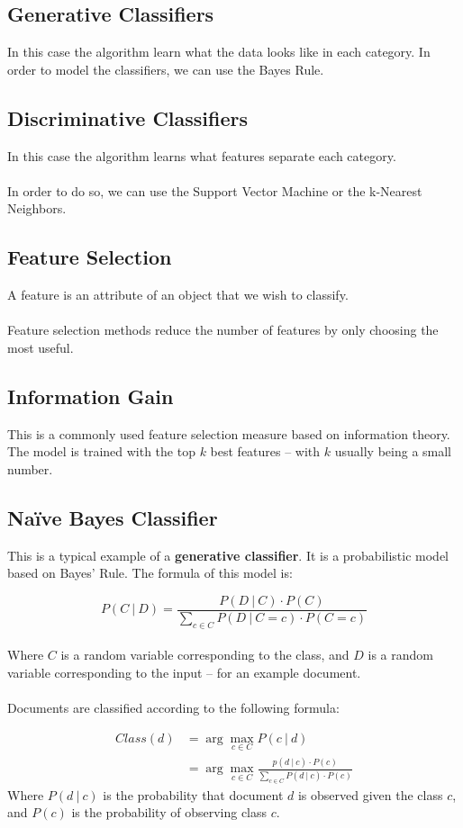 \documentclass{article}
\begin{document}
\subsection{Generative Classifiers}
In this case the algorithm learn what the data looks like in each category. In order to model the classifiers, we can use the Bayes Rule.

\subsection{Discriminative Classifiers}
In this case the algorithm learns what features separate each category. \\ \\
In order to do so, we can use the Support Vector Machine or the k-Nearest Neighbors.

\subsection{Feature Selection}
A feature is an attribute of an object that we wish to classify. \\ \\
Feature selection methods reduce the number of features by only choosing the most useful.

\subsection{Information Gain}
This is a commonly used feature selection measure based on information theory. The model is trained with the top $k$ best features -- with $k$ usually being a small number.

\subsection{Naïve Bayes Classifier}
This is a typical example of a \textbf{generative classifier}. It is a probabilistic model based on Bayes' Rule. The formula of this model is:

\[ P(C~|~D) = \frac{P(D~|~C) \cdot P(C)}{\sum_{c \in C}P(D~|~C=c) \cdot P(C=c)} \] \\
Where $C$ is a random variable corresponding to the class, and $D$ is a random variable corresponding to the input -- for an example document. \\ \\
Documents are classified according to the following formula:

\begin{align*}
Class(d) & = \arg \max_{c \in C} P(c~|~d) \\
& = \arg \max_{c \in C} \frac{p(d~|~c) \cdot P(c)}{\sum_{c \in C} P(d~|~c) \cdot P(c)}
\end{align*}
Where $P(d~|~c)$ is the probability that document $d$ is observed given the class $c$, and $P(c)$ is the probability of observing class $c$.
\end{document}
